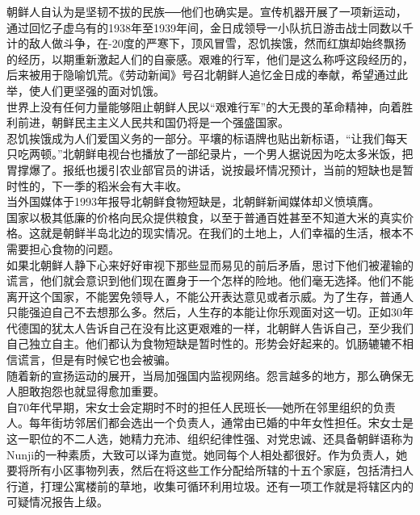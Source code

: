 \begin{multicols}{\theparacolNo}
朝鲜人自认为是坚韧不拔的民族──他们也确实是。宣传机器开展了一项新运动，通过回忆子虚乌有的1938年至1939年间，金日成领导一小队抗日游击战士同数以千计的敌人做斗争，在-20度的严寒下，顶风冒雪，忍饥挨饿，然而红旗却始终飘扬的经历，以期重新激起人们的自豪感。艰难的行军，他们是这么称呼这段经历的，后来被用于隐喻饥荒。《劳动新闻》号召北朝鲜人追忆金日成的奉献，希望通过此举，使人们更坚强的面对饥饿。\\

世界上没有任何力量能够阻止朝鲜人民以“艰难行军”的大无畏的革命精神，向着胜利前进，朝鲜民主主义人民共和国仍将是一个强盛国家。\\

忍饥挨饿成为人们爱国义务的一部分。平壤的标语牌也贴出新标语，“让我们每天只吃两顿。”北朝鲜电视台也播放了一部纪录片，一个男人据说因为吃太多米饭，把胃撑爆了。报纸也援引农业部官员的讲话，说按最坏情况预计，当前的短缺也是暂时性的，下一季的稻米会有大丰收。\\

当外国媒体于1993年报导北朝鲜食物短缺是，北朝鲜新闻媒体却义愤填膺。\\

国家以极其低廉的价格向民众提供粮食，以至于普通百姓甚至不知道大米的真实价格。这就是朝鲜半岛北边的现实情况。在我们的土地上，人们幸福的生活，根本不需要担心食物的问题。\\

如果北朝鲜人静下心来好好审视下那些显而易见的前后矛盾，思讨下他们被灌输的谎言，他们就会意识到他们现在置身于一个怎样的险地。他们毫无选择。他们不能离开这个国家，不能罢免领导人，不能公开表达意见或者示威。为了生存，普通人只能强迫自己不去想那么多。然后，人生存的本能让你乐观面对这一切。正如30年代德国的犹太人告诉自己在没有比这更艰难的一样，北朝鲜人告诉自己，至少我们自己独立自主。他们都认为食物短缺是暂时性的。形势会好起来的。饥肠辘辘不相信谎言，但是有时候它也会被骗。\\

随着新的宣扬运动的展开，当局加强国内监视网络。怨言越多的地方，那么确保无人胆敢抱怨也就显得愈加重要。\\

自70年代早期，宋女士会定期时不时的担任人民班长──她所在邻里组织的负责人。每年街坊邻居们都会选出一个负责人，通常由已婚的中年女性担任。宋女士是这一职位的不二人选，她精力充沛、组织纪律性强、对党忠诚、还具备朝鲜语称为Nunji的一种素质，大致可以译为直觉。她同每个人相处都很好。作为负责人，她要将所有小区事物列表，然后在将这些工作分配给所辖的十五个家庭，包括清扫人行道，打理公寓楼前的草地，收集可循环利用垃圾。还有一项工作就是将辖区内的可疑情况报告上级。\\


\end{multicols}
